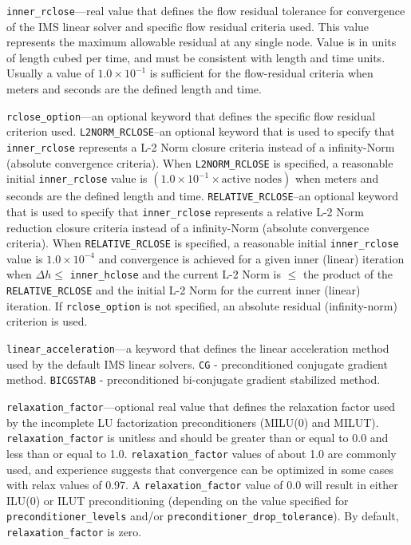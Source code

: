 \item \texttt{inner\_rclose}---real value that defines the flow residual tolerance for convergence of the IMS linear solver and specific flow residual criteria used. This value represents the maximum allowable residual at any single node.  Value is in units of length cubed per time, and must be consistent with \mf length and time units. Usually a value of $1.0 \times 10^{-1}$ is sufficient for the flow-residual criteria when meters and seconds are the defined \mf length and time.

\item \texttt{rclose\_option}---an optional keyword that defines the specific flow residual criterion used.  \texttt{L2NORM\_RCLOSE}--an optional keyword that is used to specify that \texttt{inner\_rclose} represents a L-2 Norm closure criteria instead of a infinity-Norm (absolute convergence criteria). When \texttt{L2NORM\_RCLOSE} is specified, a reasonable initial \texttt{inner\_rclose} value is $\left( 1.0 \times 10^{-1} \times \text{active nodes} \right)$ when meters and seconds are the defined \mf length and time.  \texttt{RELATIVE\_RCLOSE}--an optional keyword that is used to specify that \texttt{inner\_rclose} represents a relative L-2 Norm reduction closure criteria instead of a infinity-Norm (absolute convergence criteria). When \texttt{RELATIVE\_RCLOSE} is specified, a reasonable initial \texttt{inner\_rclose} value is $1.0 \times 10^{-4}$ and convergence is achieved for a given inner (linear) iteration when $\Delta h \le$ \texttt{inner\_hclose} and the current L-2 Norm is $\le$ the product of the \texttt{RELATIVE\_RCLOSE} and the initial L-2 Norm for the current inner (linear) iteration. If \texttt{rclose\_option} is not specified, an absolute residual (infinity-norm) criterion is used.

\item \texttt{linear\_acceleration}---a keyword that defines the linear acceleration method used by the default IMS linear solvers.  \texttt{CG} - preconditioned conjugate gradient method.  \texttt{BICGSTAB} - preconditioned bi-conjugate gradient stabilized method.

\item \texttt{relaxation\_factor}---optional real value that defines the relaxation factor used by the incomplete LU factorization preconditioners (MILU(0) and MILUT). \texttt{relaxation\_factor} is unitless and should be greater than or equal to 0.0 and less than or equal to 1.0. \texttt{relaxation\_factor} values of about 1.0 are commonly used, and experience suggests that convergence can be optimized in some cases with relax values of 0.97. A \texttt{relaxation\_factor} value of 0.0 will result in either ILU(0) or ILUT preconditioning (depending on the value specified for \texttt{preconditioner\_levels} and/or \texttt{preconditioner\_drop\_tolerance}). By default,  \texttt{relaxation\_factor} is zero.

